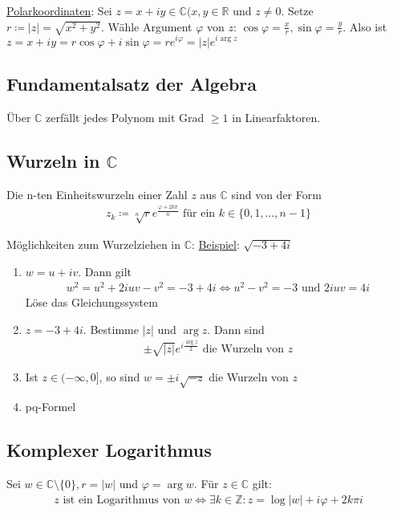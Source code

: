 \underline{Polarkoordinaten}: Sei $z=x+iy \in \mathbb{C} (x,y \in \mathbb{R}$ und $z \neq 0$. Setze $r \coloneqq |z| = \sqrt{x^2 + y^2}$.
Wähle Argument $\varphi$ von $z$: $\cos \varphi = \frac{x}{r}, \sin \varphi = \frac{y}{r}$. Also ist $z=x+iy = r\cos \varphi + i\sin \varphi = re^{i\varphi} = |z|e^{i \arg z}$

\subsection{Fundamentalsatz der Algebra}
Über $\mathbb{C}$ zerfällt jedes Polynom mit Grad $\geq 1$ in Linearfaktoren.

\subsection{Wurzeln in $\mathbb{C}$}
Die n-ten Einheitswurzeln einer Zahl $z$ aus $\mathbb{C}$ sind von der Form 
\begin{align*}
    z_k \coloneqq \sqrt[n]{r} e^{\frac{\varphi + 2k\pi}{n}} \text{ für ein } k \in \{0,1,\ldots,n-1\}
\end{align*}


Möglichkeiten zum Wurzelziehen in $\mathbb{C}$:
\underline{Beispiel}: $\sqrt{-3+4i}$
\begin{enumerate}
    \item $w=u+iv$. Dann gilt
    \begin{align*}
        w^2 = u^2 + 2iuv - v^2 = -3+4i \Leftrightarrow u^2 - v^2 = -3 \text{ und } 2iuv=4i
    \end{align*}
    Löse das Gleichungssystem
    \item $z=-3+4i$. Bestimme $|z|$ und $\arg z$. Dann sind 
    \begin{align*}
        \pm \sqrt{|z|} e^{i \frac{\arg z}{2}} \text{ die Wurzeln von } z
    \end{align*}
    \item Ist $z \in (-\infty,0]$, so sind $w=\pm i \sqrt{-z}$ die Wurzeln von $z$
    \item pq-Formel
\end{enumerate}

\subsection{Komplexer Logarithmus}
Sei $w\in \mathbb{C} \setminus \{0\}, r=|w|$ und $\varphi = \arg w$. Für $z \in \mathbb{C}$ gilt: 
\begin{align*}
    z \text{ ist ein Logarithmus von } w \Leftrightarrow \exists k \in \mathbb{Z}: z = \log |w| + i\varphi + 2k\pi i
\end{align*}